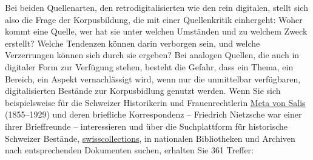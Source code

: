 \documentclass[
  letterpaper,
]{book}
\begin{document}
Bei beiden Quellenarten, den retrodigitalisierten wie den rein
digitalen, stellt sich also die Frage der Korpusbildung, die mit einer
Quellenkritik einhergeht: Woher kommt eine Quelle, wer hat sie unter
welchen Umständen und zu welchem Zweck erstellt? Welche Tendenzen können
darin verborgen sein, und welche Verzerrungen können sich durch sie
ergeben? Bei analogen Quellen, die auch in digitaler Form zur Verfügung
stehen, besteht die Gefahr, dass ein Thema, ein Bereich, ein Aspekt
vernachlässigt wird, wenn nur die unmittelbar verfügbaren,
digitalisierten Bestände zur Korpusbidlung genutzt werden. Wenn Sie sich
beispielsweise für die Schweizer Historikerin und Frauenrechtlerin
\href{https://de.wikipedia.org/wiki/Meta_von_Salis}{Meta von Salis}
(1855--1929) und deren briefliche Korrespondenz -- Friedrich Nietzsche
war einer ihrer Brieffreunde -- interessieren und über die Suchplattform
für historische Schweizer Bestände,
\href{https://swisscollections.ch/Search/Advanced}{swisscollections}, in
nationalen Bibliotheken und Archiven nach entsprechenden Dokumenten
suchen, erhalten Sie 361 Treffer:
\end{document}
